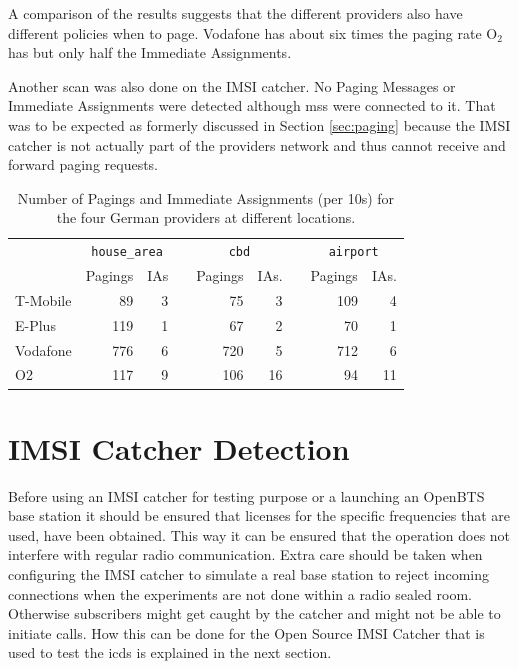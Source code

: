 A comparison of the results suggests that the different providers also have different policies when to page.
Vodafone has about six times the paging rate O$_{2}$ has but only half the Immediate Assignments.

Another scan was also done on the IMSI catcher.
No Paging Messages or Immediate Assignments were detected although \glspl{ms} were connected to it.
That was to be expected as formerly discussed in Section \ref{sec:paging} because the IMSI catcher is not actually part of the providers network and thus cannot receive and forward paging requests.

\begin{table}
\centering
\begin{tabular}{lrrcrrcrr}
\toprule
& \multicolumn{2}{c}{\texttt{house\_area}} &\phantom{a}& \multicolumn{2}{c}{\texttt{cbd}} &\phantom{a} & \multicolumn{2}{c}{\texttt{airport}}\\
\cmidrule{2-3} \cmidrule{5-6} \cmidrule{8-9}
&Pagings&IAs&	&Pagings &IAs.&	&Pagings&IAs.\\
\midrule
T-Mobile&		89&3&	&75&3&	&109&4\\
E-Plus&		119&1&	&67&2&	&70&1\\
Vodafone&		776&6&	&720&5&	&712&6\\
O2&		117&9&	&106&16&	&94&11\\
\bottomrule
\end{tabular}
\caption{Number of Pagings and Immediate Assignments (per 10\;s) for the four German providers at different locations.}
\label{tab:pagings}
\end{table}

\section{IMSI Catcher Detection}
Before using an IMSI catcher for testing purpose or a launching an OpenBTS base station it should be ensured that licenses for the specific frequencies that are used, have been obtained.
This way it can be ensured that the operation does not interfere with regular radio communication.
Extra care should be taken when configuring the IMSI catcher to simulate a real base station to reject incoming connections when the experiments are not done within a radio sealed room.
Otherwise subscribers might get caught by the catcher and might not be able to initiate calls.
How this can be done for the Open Source IMSI Catcher that is used to test the \gls{icds} is explained in the next section.

